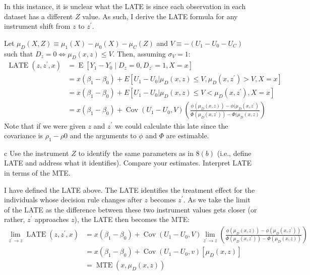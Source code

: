 \documentclass{article}
\begin{document}
\begin{solution}
\begin{figure}[H]
\begin{subfigure}[b]{0.43\textwidth}
    \end{subfigure}
\end{figure}


In this instance, it is unclear what the LATE is since each observation in each dataset has a different $Z$ value. As such, I derive the LATE formula for any instrument shift from $z$ to $z^\prime$. 

Let $\mu_D(X,Z) \equiv \mu_1(X)- \mu_0(X) - \mu_C(Z)$ and $V \equiv - (U_1 - U_0 - U_C)$ such that $D_z = 0 \Leftrightarrow \mu_D(x,z) \leq V $. Then, assuming $\sigma_V=1$:
\begin{align*}
    \operatorname{LATE}(z,z^\prime,x) &= \operatorname{E}[Y_1 - Y_0 \mid D_z = 0, D_{z^\prime}=1,X=x] \\
    &= x(\beta_1 - \beta_0) + E[U_1-U_0 | \mu_D(x,z) \leq V, \mu_D(x,z^\prime) > V, X=x] \\
    &= x(\beta_1 - \beta_0) + E[U_1-U_0 | \mu_D(x,z) \leq V < \mu_D(x,z^\prime) , X=x] \\
    &= x(\beta_1 - \beta_0) + \operatorname{Cov}(U_1-U_0,V) 
    \left( \frac{\phi(\mu_D(x,z))-\phi(\mu_D(x,z^\prime)}{\Phi(\mu_D(x,z^\prime))-\Phi(\mu_D(x,z)} \right)
\end{align*}
Note that if we were given $z$ and $z^\prime$ we could calculate this late since the covariance is $\rho_1 - \rho0$ and the arguments to $\phi$ and $\Phi$ are estimable.
\end{solution}

\begin{problem}{c}
Use the instrument $Z$ to identify the same parameters as in $8(b)$ (i.e., define LATE and address what it identifies). Compare your estimates. Interpret LATE in terms of the MTE.
\end{problem}
\begin{solution}
I have defined the LATE above. The LATE identifies the treatment effect for the individuals whose decision rule changes after $z$ becomes $z^\prime$. As we take the limit of the LATE as the difference between these two instrument values gets closer (or rather, $z^\prime$ approaches $z$), the LATE then becomes the MTE:
\begin{align*}
    \lim _{z^{\prime} \rightarrow z} \operatorname{LATE}\left(z, z^{\prime}, x\right)
    &=x\left(\beta_{1}-\beta_{0}\right)+\operatorname{Cov}\left(U_{1}-U_{0}, V\right) \lim _{z^{\prime} \rightarrow z}\left(\frac{\phi(\mu_D(x,z))-\phi\left(\mu_D(x,z^\prime)\right)}{\Phi\left(\mu_D(x,z^\prime)\right)-\Phi(\mu_D(x,z))}\right) \\
&=x\left(\beta_{1}-\beta_{0}\right)+\operatorname{Cov}\left(U_{1}-U_{0}, v\right)[\mu_D(x,z)] \\
&=\operatorname{MTE}(x,\mu_D(x,z))
\end{align*}

\end{solution}
\end{document}

